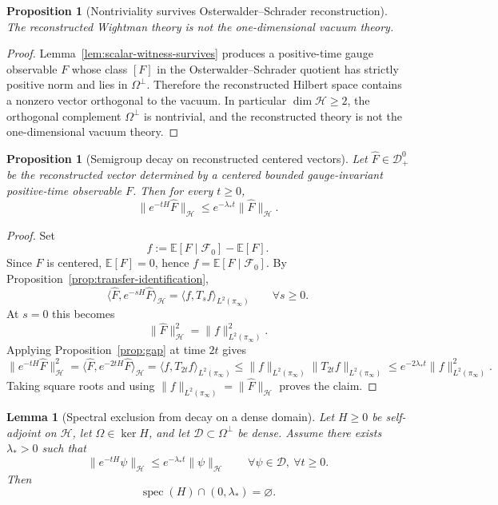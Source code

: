 \documentclass[11pt]{article}
\newtheorem{proposition}[theorem]{Proposition}
\newtheorem{lemma}[theorem]{Lemma}
\theoremstyle{definition}
\theoremstyle{remark}
\newcommand{\mcH}{\mathcal H}
\newcommand{\spec}{\operatorname{spec}}
\begin{document}
\begin{proposition}[Nontriviality survives Osterwalder--Schrader reconstruction]
\label{prop:reconstructed-nontriviality}
The reconstructed Wightman theory is not the one-dimensional vacuum theory.
\end{proposition}

\begin{proof}
Lemma~\ref{lem:scalar-witness-survives} produces a positive-time gauge
observable $F$ whose class $[F]$ in the Osterwalder--Schrader quotient has
strictly positive norm and lies in $\Omega^\perp$.  Therefore the reconstructed
Hilbert space contains a nonzero vector orthogonal to the vacuum.  In
particular $\dim\mcH\ge2$, the orthogonal complement $\Omega^\perp$ is
nontrivial, and the reconstructed theory is not the one-dimensional vacuum
theory.
\end{proof}

\begin{proposition}[Semigroup decay on reconstructed centered vectors]
\label{prop:reconstructed-semigroup-decay}
Let $\widehat F\in\mathcal D_+^0$ be the reconstructed vector determined by a
centered bounded gauge-invariant positive-time observable $F$.  Then for every
$t\ge0$,
\[
\|e^{-tH}\widehat F\|_{\mcH}
\le
e^{-\lambda_* t}\|\widehat F\|_{\mcH}.
\]
\end{proposition}

\begin{proof}
Set
\[
f:=\mathbb E[F\mid\mathcal F_0]-\mathbb E[F].
\]
Since $F$ is centered, $\mathbb E[F]=0$, hence
$f=\mathbb E[F\mid\mathcal F_0]$.  By
Proposition~\ref{prop:transfer-identification},
\[
\langle \widehat F,e^{-sH}\widehat F\rangle_{\mcH}
=
\langle f,T_s f\rangle_{L^2(\pi_\infty)}
\qquad
\forall s\ge0.
\]
At $s=0$ this becomes
\[
\|\widehat F\|_{\mcH}^2=\|f\|_{L^2(\pi_\infty)}^2.
\]
Applying Proposition~\ref{prop:gap} at time $2t$ gives
\[
\|e^{-tH}\widehat F\|_{\mcH}^2
=
\langle \widehat F,e^{-2tH}\widehat F\rangle_{\mcH}
=
\langle f,T_{2t}f\rangle_{L^2(\pi_\infty)}
\le
\|f\|_{L^2(\pi_\infty)}\|T_{2t}f\|_{L^2(\pi_\infty)}
\le
e^{-2\lambda_* t}\|f\|_{L^2(\pi_\infty)}^2.
\]
Taking square roots and using $\|f\|_{L^2(\pi_\infty)}=\|\widehat F\|_{\mcH}$
proves the claim.
\end{proof}

\begin{lemma}[Spectral exclusion from decay on a dense domain]
\label{lem:spectral-exclusion}
Let \(H\ge0\) be self-adjoint on \(\mcH\), let \(\Omega\in\ker H\), and let
\(\mathcal D\subset\Omega^\perp\) be dense.  Assume there exists
\(\lambda_*>0\) such that
\[
\|e^{-tH}\psi\|_{\mcH}\le e^{-\lambda_* t}\|\psi\|_{\mcH}
\qquad
\forall \psi\in\mathcal D,\ \forall t\ge0.
\]
Then
\[
\spec(H)\cap(0,\lambda_*)=\varnothing.
\]
\end{lemma}
\end{document}

